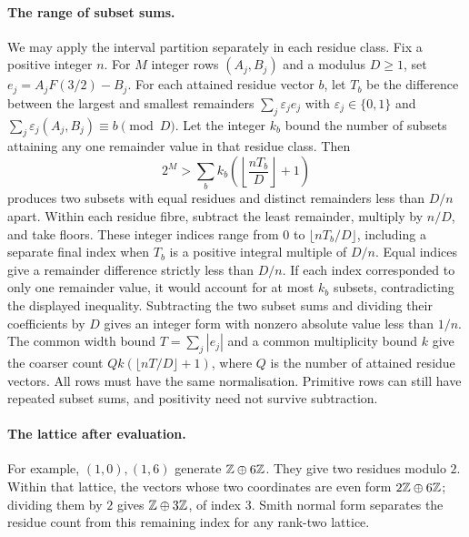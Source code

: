 \documentclass[11pt]{article}
\begin{document}
\paragraph{The range of subset sums.}
We may apply the interval partition separately in each residue class.
Fix a positive integer $n$. For $M$ integer rows $(A_j,B_j)$ and a modulus
$D\ge1$, set $e_j=A_jF(3/2)-B_j$. For each attained residue vector $b$,
let $T_b$ be the difference between the largest and smallest remainders
$\sum_j\varepsilon_je_j$ with $\varepsilon_j\in\{0,1\}$ and
$\sum_j\varepsilon_j(A_j,B_j)\equiv b\pmod D$. Let the integer $k_b$
bound the number of subsets attaining any one remainder value in that
residue class. Then
\[
 2^M>\sum_b k_b\left(\left\lfloor\frac{nT_b}{D}\right\rfloor+1\right)
\]
produces two subsets with equal residues and distinct remainders
less than $D/n$ apart. Within each residue fibre, subtract the least
remainder, multiply by $n/D$, and take floors. These integer indices range
from $0$ to $\lfloor nT_b/D\rfloor$, including a separate final index
when $T_b$ is a positive integral multiple of $D/n$. Equal indices
give a remainder difference strictly less than $D/n$. If each index
corresponded to only one remainder value, it would account for at most
$k_b$ subsets, contradicting the displayed inequality. Subtracting the
two subset sums and dividing their coefficients by $D$ gives an integer
form with nonzero absolute value less than $1/n$. The common width bound
$T=\sum_j|e_j|$ and a common multiplicity bound $k$ give the coarser
count $Qk(\lfloor nT/D\rfloor+1)$, where $Q$ is the number of attained
residue vectors. All rows must have the same normalisation. Primitive
rows can still have repeated subset sums, and positivity need not
survive subtraction.

\paragraph{The lattice after evaluation.}
For example, $(1,0),(1,6)$ generate $\mathbb{Z}\oplus6\mathbb{Z}$. They give two
residues modulo $2$. Within that lattice, the vectors whose two
coordinates are even form $2\mathbb{Z}\oplus6\mathbb{Z}$; dividing them by $2$ gives
$\mathbb{Z}\oplus3\mathbb{Z}$, of index $3$. Smith normal form separates the residue
count from this remaining index for any rank-two lattice.
\end{document}
